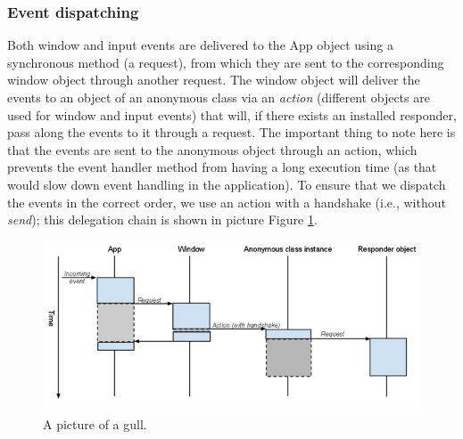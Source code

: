 \documentclass[a4paper]{article}
\begin{document}
\subsubsection{Event dispatching}
Both window and input events are delivered to the App object using a synchronous method (a request), from which they are sent to the corresponding window object through another request. The window object will deliver the events to an object of an anonymous class via an \textit{action} (different objects are used for window and input events) that will, if there exists an installed responder, pass along the events to it through a request. The important thing to note here is that the events are sent to the anonymous object through an action, which prevents the event handler method from having a long execution time (as that would slow down event handling in the application). To ensure that we dispatch the events in the correct order, we use an action with a handshake (i.e., without \textit{send}); this delegation chain is shown in picture Figure \ref{fig:eventchain}.
\newpage
\begin{figure}[h!]
  \caption{A picture of a gull.}
  \label{fig:eventchain}
  \centering
    \includegraphics[width=\textwidth]{eventChain.png}
\end{figure}
\end{document}
